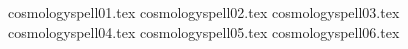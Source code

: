 
\newcosmologylogo

\starttablecosmology
\tablepassivecosmology{\cosmologypassive}{\cosmologypassivedef}
\tablelabelscosmology
{cosmologyspell01.tex}%
\spellrule
{cosmologyspell02.tex}%
\spellrule
{cosmologyspell03.tex}%
\spellrule
{cosmologyspell04.tex}%
\spellrule
{cosmologyspell05.tex}%
\spellrule
{cosmologyspell06.tex}%
\closetablecosmology{}

